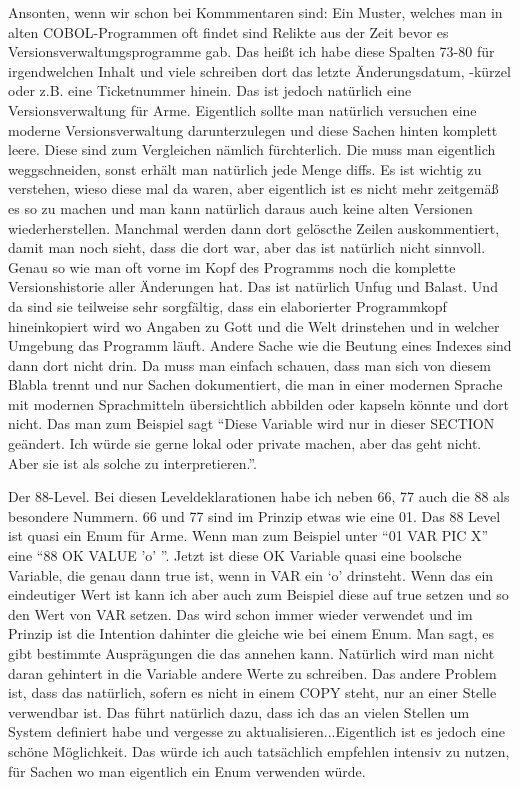 {Ansonten, wenn wir schon bei Kommmentaren sind: Ein Muster, welches man in alten COBOL-Programmen oft findet sind Relikte aus der Zeit bevor es Versionsverwaltungsprogramme gab. Das heißt ich habe diese Spalten 73-80 für irgendwelchen Inhalt und viele schreiben dort das letzte Änderungsdatum, -kürzel oder z.B. eine Ticketnummer hinein. Das ist jedoch natürlich eine Versionsverwaltung für Arme. Eigentlich sollte man natürlich versuchen eine moderne Versionsverwaltung darunterzulegen und diese Sachen hinten komplett leere. Diese sind zum Vergleichen nämlich fürchterlich. Die muss man eigentlich weggschneiden, sonst erhält man natürlich jede Menge diffs. Es ist wichtig zu verstehen, wieso diese mal da waren, aber eigentlich ist es nicht mehr zeitgemäß es so zu machen und man kann natürlich daraus auch keine alten Versionen wiederherstellen. Manchmal werden dann dort gelöscthe Zeilen auskommentiert, damit man noch sieht, dass die dort war, aber das ist natürlich nicht sinnvoll. Genau so wie man oft vorne im Kopf des Programms noch die komplette Versionshistorie aller Änderungen hat. Das ist natürlich Unfug und Balast. Und da sind sie teilweise sehr sorgfältig, dass ein elaborierter Programmkopf hineinkopiert wird wo Angaben zu Gott und die Welt drinstehen und in welcher Umgebung das Programm läuft. Andere Sache wie die Beutung eines Indexes sind dann dort nicht drin. Da muss man einfach schauen, dass man sich von diesem Blabla trennt und nur Sachen dokumentiert, die man in einer modernen Sprache mit modernen Sprachmitteln übersichtlich abbilden oder kapseln könnte und dort nicht. Das man zum Beispiel sagt ``Diese Variable wird nur in dieser SECTION geändert. Ich würde sie gerne lokal oder private machen, aber das geht nicht. Aber sie ist als solche zu interpretieren.''.

Der 88-Level. Bei diesen Leveldeklarationen habe ich neben 66, 77 auch die 88 als besondere Nummern. 66 und 77 sind im Prinzip etwas wie eine 01. Das 88 Level ist quasi ein Enum für Arme. Wenn man zum Beispiel unter ``01 VAR PIC X'' eine ``88 OK VALUE 'o' ''. Jetzt ist diese OK Variable quasi eine boolsche Variable, die genau dann true ist, wenn in VAR ein `o' drinsteht. Wenn das ein eindeutiger Wert ist kann ich aber auch zum Beispiel diese auf true setzen und so den Wert von VAR setzen. Das wird schon immer wieder verwendet und im Prinzip ist die Intention dahinter die gleiche wie bei einem Enum. Man sagt, es gibt bestimmte Ausprägungen die das annehen kann. Natürlich wird man nicht daran gehintert in die Variable andere Werte zu schreiben. Das andere Problem ist, dass das natürlich, sofern es nicht in einem COPY steht, nur an einer Stelle verwendbar ist. Das führt natürlich dazu, dass ich das an vielen Stellen um System definiert habe und vergesse zu aktualisieren...Eigentlich ist es jedoch eine schöne Möglichkeit. Das würde ich auch tatsächlich empfehlen intensiv zu nutzen, für Sachen wo man eigentlich ein Enum verwenden würde. }  
